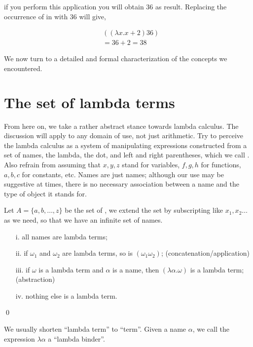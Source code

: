 \documentclass[11pt]{article}
\begin{document}
if you perform this application you will obtain 36 as result. Replacing the occurrence of  in  with 36 will give,

\begin{align}
& ((\lambda x. x+2)36)\\
& = 36+2 = 38 \nonumber
\end{align}


We now turn to a detailed and formal characterization of the concepts we encountered.


\section{The set of lambda terms}

From here on, we take a rather abstract stance towards lambda calculus.  The discussion will apply to any domain of use, not just arithmetic. Try to perceive the lambda calculus as a system of manipulating expressions constructed from a set of names, the lambda, the dot, and left and right parentheses, which we call . Also refrain from assuming that $x, y, z$ stand for variables, $f, g, h$ for functions, $a, b, c$  for constants, etc. Names are just names; although our use may be suggestive at times, there is no necessary association between a name and the type of object it stands for.

\begin{udefinition}\label{dfexp}
Let $A=\{ a,b,\ldots,z\}$ be the set of , we extend the set by subscripting like $x_1,x_2\ldots$ as we need, so that we have an infinite set of names.

\begin{itemize}
\item[i.] all names are lambda terms; 
\item[ii.] if $\omega_1$ and $\omega_2$ are lambda terms, so is $(\omega_1\omega_2)$; \hfill (concatenation/application)
\item[iii.] if $\omega$ is a lambda term and $\alpha$ is a name, then
$(\lambda\alpha.\omega)$ is a lambda term; \hfill (abstraction) 
\item[iv.] nothing else is a lambda term.
\end{itemize}
\qed
\end{udefinition} 

We usually shorten ``lambda term'' to ``term''. Given a name $\alpha$, we call the expression $\lambda\alpha$ a ``lambda binder''.
\end{document}
